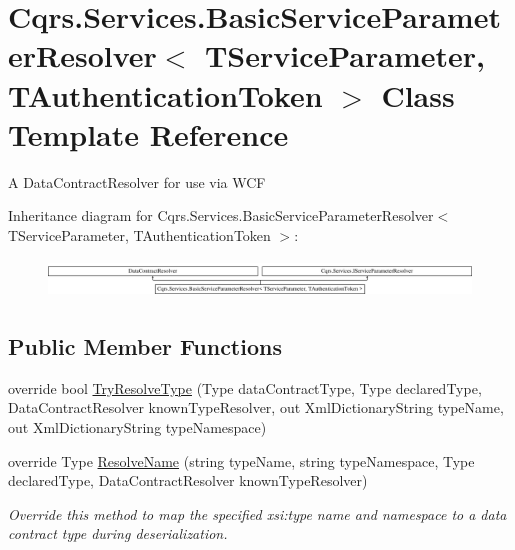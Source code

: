 \hypertarget{classCqrs_1_1Services_1_1BasicServiceParameterResolver}{}\section{Cqrs.\+Services.\+Basic\+Service\+Parameter\+Resolver$<$ T\+Service\+Parameter, T\+Authentication\+Token $>$ Class Template Reference}
\label{classCqrs_1_1Services_1_1BasicServiceParameterResolver}


A Data\+Contract\+Resolver for use via W\+CF  


Inheritance diagram for Cqrs.\+Services.\+Basic\+Service\+Parameter\+Resolver$<$ T\+Service\+Parameter, T\+Authentication\+Token $>$\+:\begin{figure}[H]
\begin{center}
\leavevmode
\includegraphics[height=1.018182cm]{classCqrs_1_1Services_1_1BasicServiceParameterResolver}
\end{center}
\end{figure}
\subsection*{Public Member Functions}
\begin{DoxyCompactItemize}
\item 
override bool \hyperlink{classCqrs_1_1Services_1_1BasicServiceParameterResolver_adbc4b10f8931db30768d7ca84bdb0260_adbc4b10f8931db30768d7ca84bdb0260}{Try\+Resolve\+Type} (Type data\+Contract\+Type, Type declared\+Type, Data\+Contract\+Resolver known\+Type\+Resolver, out Xml\+Dictionary\+String type\+Name, out Xml\+Dictionary\+String type\+Namespace)
\item 
override Type \hyperlink{classCqrs_1_1Services_1_1BasicServiceParameterResolver_a8c598f2f49a83190c315afc88e5630d5_a8c598f2f49a83190c315afc88e5630d5}{Resolve\+Name} (string type\+Name, string type\+Namespace, Type declared\+Type, Data\+Contract\+Resolver known\+Type\+Resolver)
\begin{DoxyCompactList}\small\item\em Override this method to map the specified xsi\+:type name and namespace to a data contract type during deserialization. \end{DoxyCompactList}\end{DoxyCompactItemize}
